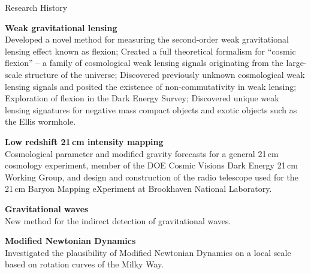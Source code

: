 \documentclass{resume} %
\begin{document}
\begin{rSection}{Research History}

\begin{description}[leftmargin=8em, style=nextline]

\item[\textnormal{2018 -- Present}] \textbf{Weak gravitational lensing}\\
  Developed a novel method for measuring the second-order weak gravitational lensing effect known as flexion;
  Created a full theoretical formalism for ``cosmic flexion'' -- a family of cosmological weak lensing signals originating from the large-scale structure of the universe;  Discovered previously unknown cosmological weak lensing signals and posited the existence of non-commutativity in weak lensing;
  Exploration of flexion in the Dark Energy Survey;
  Discovered unique weak lensing signatures for negative mass compact objects and exotic objects such as the Ellis wormhole.
 
\item[\textnormal{2015 -- 2019}] \textbf{Low redshift 21$\,$cm intensity mapping}\\
 Cosmological parameter and modified gravity forecasts for a general 21$\,$cm cosmology 
 experiment, member of the DOE Cosmic Visions Dark Energy 21$\,$cm Working Group, and design and construction
 of the radio telescope used for the 21$\,$cm Baryon Mapping eXperiment at Brookhaven National
 Laboratory.
\item[\textnormal{2013}] \textbf{Gravitational waves}\\
  New method for the indirect detection of gravitational waves.
  
\item[\textnormal{2012}] \textbf{Modified Newtonian Dynamics}\\
 Investigated the plausibility of Modified Newtonian Dynamics on a local scale based on
 rotation curves of the Milky Way.

\end{description}

\end{rSection}

\end{document}
